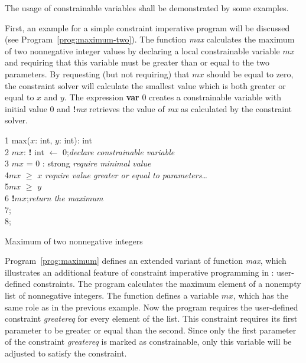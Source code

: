 The usage of constrainable variables shall be demonstrated by some
examples.

First, an example for a simple constraint imperative program will be
discussed (see Program~\ref{prog:maximum-two}).  The function {\em
  max} calculates the maximum of two nonnegative integer values by
declaring a local constrainable variable $mx$ and requiring that this
variable must be greater than or equal to the two parameters.  By
requesting (but not requiring) that $mx$ should be equal to zero, the
constraint solver will calculate the smallest value which is both
greater or equal to $x$ and $y$.  The expression {\bf var} 0 creates a
constrainable variable with initial value 0 and {\bf !}{\em mx}
retrieves the value of {\em mx} as calculated by the constraint
solver.

\begin{Program}
\begin{ttlprog}
1\>\ttlFun{} max($x$: int, $y$: int): int\\
2\>\>\ttlVar{} $mx$: {\bf!} int $\leftarrow$ \ttlVar{} 0;\`{\em declare constrainable variable}\\
3\>\>\ttlRequire{} $mx$ = 0 : strong \ttlAnd{}\`{\em require minimal value}\\
4\>\>\>$mx$ $\geq$ $x$ \ttlAnd{}\`{\em require value greater or equal to parameters\dots}\\
5\>\>\>$mx$ $\geq$ $y$ \ttlIn{}\\
6\>\>\>\ttlReturn{} {\bf !}$mx$;\`{\em return the maximum}\\
7\>\>\ttlEnd{};\\
8\>\ttlEnd{};
\end{ttlprog}
\caption{Maximum of two nonnegative integers}
\label{prog:maximum-two}
\end{Program}

Program~\ref{prog:maximum} defines an extended variant of function
{\em max}, which illustrates an additional feature of constraint
imperative programming in \turtle{}: user-defined constraints.  The
program calculates the maximum element of a nonempty list of
nonnegative integers.  The function defines a variable $mx$, which has
the same role as in the previous example.  Now the program requires
the user-defined constraint {\em greatereq} for every element of the
list.  This constraint requires its first parameter to be greater or
equal than the second.  Since only the first parameter of the
constraint {\em greatereq} is marked as constrainable, only this
variable will be adjusted to satisfy the constraint.


